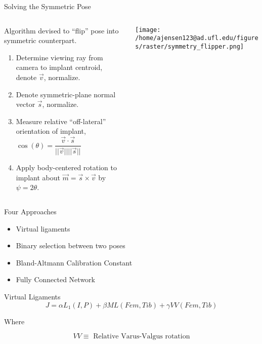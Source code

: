 \documentclass[presentation, aspectratio=1610]{beamer}
\begin{document}
\begin{frame}[label={sec:orga16edcd}]{Solving the Symmetric Pose}
\begin{columns}
\begin{column}{0.5\columnwidth}
Algorithm devised to ``flip'' pose into symmetric counterpart.
\begin{enumerate}
\item Determine viewing ray from camera to implant centroid, denote \(\vec{v}\), normalize.
\item Denote symmetric-plane normal vector \(\vec{s}\), normalize.
\item Measure relative ``off-lateral'' orientation of implant, \(\cos(\theta) = \dfrac{\vec{v} \cdot \vec{s}}{||\vec{v} || ||\vec{s} || }\)
\item Apply body-centered rotation to implant about \(\vec{m} = \vec{s} \times \vec{v}\) by \(\psi = 2\theta\).
\end{enumerate}
\end{column}
\begin{column}{0.6\columnwidth}
\begin{center}
\texttt{[image: /home/ajensen123@ad.ufl.edu/figures/raster/symmetry\_flipper.png]}
\end{center}
\end{column}
\end{columns}
\end{frame}
\begin{frame}[label={sec:org6b63e20}]{Four Approaches}
\begin{itemize}
\item Virtual ligaments
\item Binary selection between two poses
\item Bland-Altmann Calibration Constant
\item Fully Connected Network
\end{itemize}
\end{frame}
\begin{frame}[label={sec:orgbc630a1}]{Virtual Ligaments}
\begin{equation*}
  J = \alpha L_{1}(I,P) + \beta ML(Fem,Tib) + \gamma VV(Fem,Tib)
\end{equation*}

Where

\begin{equation*}
  VV \equiv \text{  Relative Varus-Valgus rotation}
\end{equation*}
\end{frame}
\end{document}
